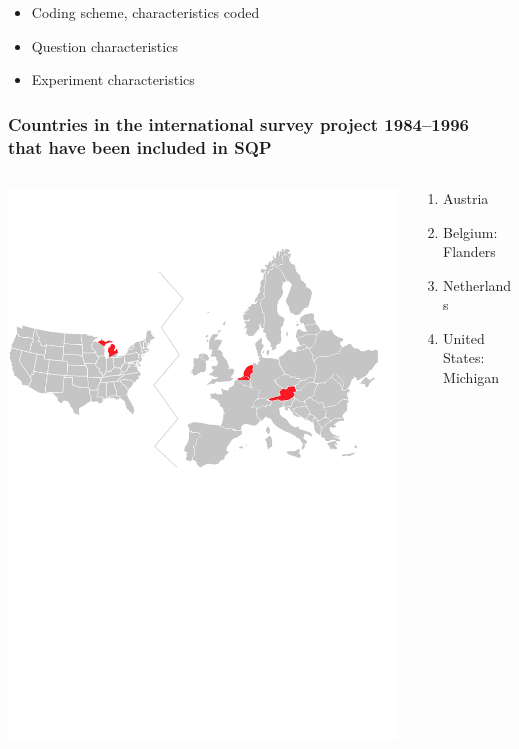 \documentclass{beamer}
\begin{document}
\begin{frame}
\begin{itemize}
	\item Coding scheme, characteristics coded
	\item Question characteristics
	\item Experiment characteristics
\end{itemize}

\end{frame}

\begin{frame}
\frametitle{Countries in the international survey project 1984--1996\\that have been included in SQP}
	\begin{columns}[T]	
		\begin{column}{8cm}
			\includegraphics[width=\textwidth]{i/andrews-etal.pdf}
		\end{column}
		\begin{column}{3.2cm}
		\begin{small}
		\begin{enumerate}
			\item Austria 
			\item Belgium: Flanders
			\item Netherlands
			\item United States: Michigan		
		\end{enumerate}
		\end{small}
		\end{column}
	\end{columns}
\end{frame}
\end{document}
